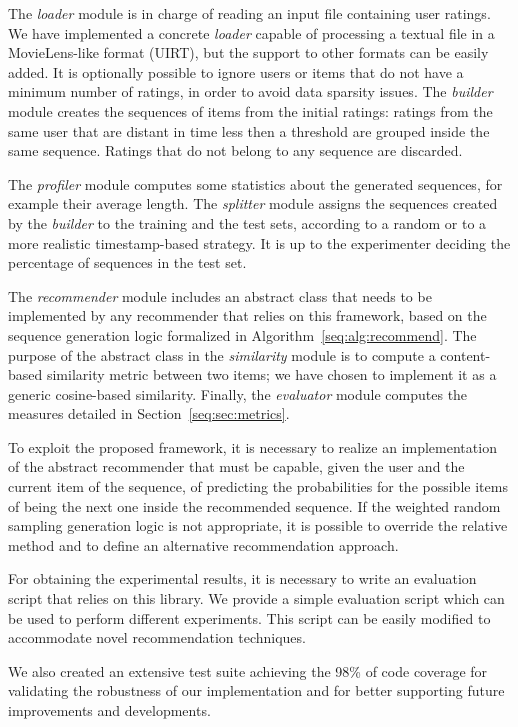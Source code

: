 The \textit{loader} module is in charge of reading an input file containing user ratings. We have implemented a concrete \textit{loader} capable of processing a textual file in a MovieLens-like format (UIRT), but the support to other formats can be easily added. It is optionally possible to ignore users or items that do not have a minimum number of ratings, in order to avoid data sparsity issues. The \textit{builder} module creates the sequences of items from the initial ratings: ratings from the same user that are distant in time less then a threshold are grouped inside the same sequence. Ratings that do not belong to any sequence are discarded.

The \textit{profiler} module computes some statistics about the generated sequences, for example their average length. The \textit{splitter} module assigns the sequences created by the \textit{builder} to the training and the test sets, according to a random or to a more realistic timestamp-based strategy. It is up to the experimenter deciding the percentage of sequences in the test set.

The \textit{recommender} module includes an abstract class that needs to be implemented by any recommender that relies on this framework, based on the sequence generation logic formalized in Algorithm~\ref{seq:alg:recommend}. The purpose of the abstract class in the \textit{similarity} module is to compute a content-based similarity metric between two items; we have chosen to implement it as a generic cosine-based similarity. Finally, the \textit{evaluator} module computes the measures detailed in Section~\ref{seq:sec:metrics}.

To exploit the proposed framework, it is necessary to realize an implementation of the abstract recommender that must be capable, given the user and the current item of the sequence, of predicting the probabilities for the possible items of being the next one inside the recommended sequence. If the weighted random sampling generation logic is not appropriate, it is possible to override the relative method and to define an alternative recommendation approach.

For obtaining the experimental results, it is necessary to write an evaluation script that relies on this library. We provide a simple evaluation script which can be used to perform different experiments. This script can be easily modified to accommodate novel recommendation techniques.

We also created an extensive test suite achieving the 98\% of code coverage for validating the robustness of our implementation and for better supporting future improvements and developments.%

